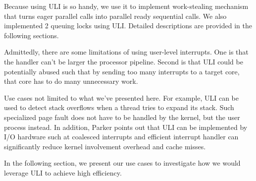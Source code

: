 Because using ULI is so handy, we use it to implement work-stealing mechanism that turns eager parallel calls into parallel ready sequential calls. We also implemented 2 queuing locks using ULI. Detailed descriptions are provided in the following sections.

Admittedly, there are some limitations of using user-level interrupts. One is that the handler can't be larger the processor pipeline. Second is that ULI could be potentially abused such that by sending too many interrupts to a target core, that core has to do many unnecessary work.

Use cases not limited to what we've presented here. For example, ULI can be used to detect stack overflows when a thread tries to expand its stack. Such specialized page fault does not have to be handled by the kernel, but the user process instead. In addition, Parker points out that ULI can be implemented by I/O hardware such at coalesced interrupts and efficient interrupt handler can significantly reduce kernel involvement overhead and cache misses.

In the following section, we present our use cases to investigate how we would leverage ULI to achieve high efficiency. 

